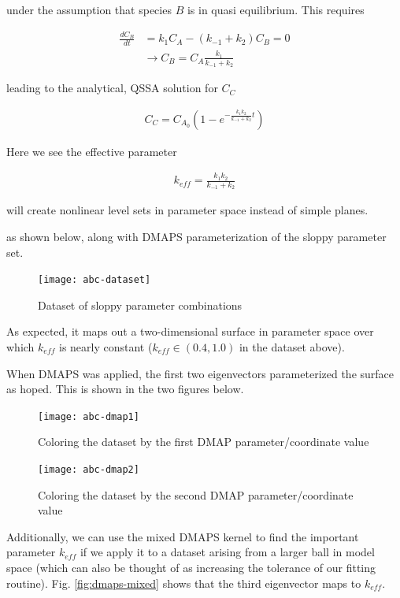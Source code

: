 \documentclass[11pt]{article}
\begin{document}
under the assumption that species $B$ is in quasi equilibrium. This requires

\begin{align*}
  \frac{dC_B}{dt} &= k_1 C_A - (k_{-1} + k_2) C_B = 0 \\
  &\rightarrow C_B = C_A \frac{k_1}{k_{-1} + k_2}
\end{align*}

leading to the analytical, QSSA solution for $C_C$

\begin{align*}
  C_C = C_{A_0}(1 - e^{-\frac{k_1 k_2}{k_{-1} + k_2} t})
\end{align*}

Here we see the effective parameter

\begin{align*}
  k_{eff} = \frac{k_1 k_2}{k_{-1} + k_2}
\end{align*}

will create nonlinear level sets in parameter space instead of simple planes.

as shown below, along with DMAPS parameterization of the sloppy parameter set.

\begin{figure}[htbp]
  \centering
  \texttt{[image: abc-dataset]}
  \caption{Dataset of sloppy parameter combinations}
\end{figure}

As expected, it maps out a two-dimensional surface in parameter space over which $k_{eff}$ is nearly constant ($k_{eff} \in (0.4, 1.0)$ in the dataset above).

When DMAPS was applied, the first two eigenvectors parameterized the surface as hoped. This is shown in the two figures below.

\begin{figure}[htbp]
  \centering
  \texttt{[image: abc-dmap1]}
  \caption{Coloring the dataset by the first DMAP parameter/coordinate value}
\end{figure}

\begin{figure}[htbp]
  \centering
  \texttt{[image: abc-dmap2]}
  \caption{Coloring the dataset by the second DMAP parameter/coordinate value}
\end{figure}

Additionally, we can use the mixed DMAPS kernel to find the important
parameter $k_{eff}$ if we apply it to a dataset arising from a larger
ball in model space (which can also be thought of as increasing the
tolerance of our fitting routine). Fig. \ref{fig:dmaps-mixed} shows
that the third eigenvector maps to $k_{eff}$.
\end{document}
